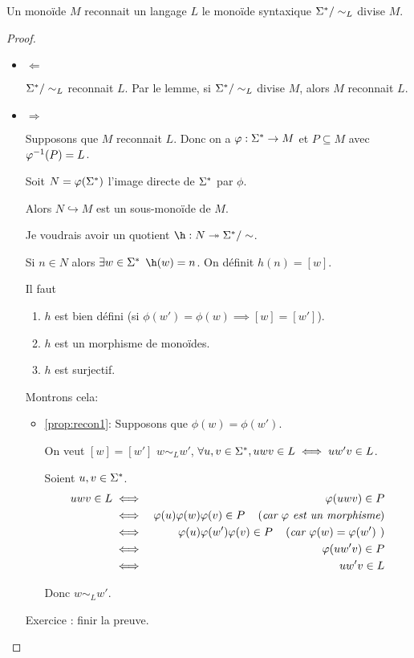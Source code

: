 \begin{prop}
	Un monoïde  $M$ reconnait  un langage $L$ \ssi le monoïde syntaxique $\Sigma^{*} / \sim_L$ divise $M$.
\end{prop}

\begin{proof}

	\begin{itemize}
		\item $\Leftarrow$

		      $\Sigma^{*} / \sim_L$ reconnait $L$. Par le lemme, si $\Sigma^{*} / \sim_L$ divise $M$, alors $M$ reconnait $L$.

		\item $\Rightarrow$

		      Supposons que $M$ reconnait $L$. Donc on a $\varphi : \Sigma^{*} \to M$ et $P \subseteq M$ avec $\varphi^{-1} (P) = L$.

		      Soit $N = \varphi (\Sigma^{*})$ l'image directe de $\Sigma^{*}$ par $\phi$.

		      Alors $N \hookrightarrow M$ est un sous-monoïde de $M$.

		      Je voudrais avoir un quotient $\h : N \twoheadrightarrow \mots/\sim$.

		      Si $n \in N$ alors $\exists w \in \Sigma^{*}$ \tq $\h(w) = n$. On définit $h(n) = [w]$. 
			  
			  Il faut \mq
		      \begin{enumerate}
			      \item $h$ est bien défini (si $\phi (w') = \phi (w) \implies [w] = [w']$). \label{prop:recon1}
			      \item $h$ est un morphisme de monoïdes.
			      \item $h$ est surjectif.
		      \end{enumerate}

		      Montrons cela:
		      \begin{itemize}
			      \item \ref{prop:recon1}: Supposons que $\phi(w) = \phi (w')$.

			            On veut \mq $[w]=[w']$ \cad $w \sim_L w'$, \cad $\forall u,v \in \Sigma^{*}, uwv \in L \iff uw'v \in L$.

			            Soient $u,v \in \Sigma^{*}$.
			            \begin{eqnarray*}
				            uwv \in L &\iff& \varphi (uwv) \in P\\
				            &\iff& \varphi (u)\varphi(w) \varphi(v) \in P \quad\left(\textit{car $\varphi$ est un morphisme}\right) \\
				            &\iff& \varphi (u)\varphi(w') \varphi(v) \in P \quad\left(\textit{car $\varphi (w) = \varphi (w')$ }\right) \\
				            &\iff& \varphi (uw'v) \in P\\
				            &\iff& uw'v \in L
			            \end{eqnarray*}

			            Donc $w \sim_L w'$.
		      \end{itemize}
			  Exercice : finir la preuve.
	\end{itemize}
\end{proof}



